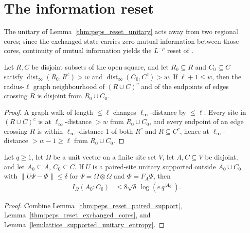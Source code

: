 \section{The information reset}

The unitary of Lemma~\ref{thm:peps_reset_unitary} acts away from two regional cores; since the exchanged state carries zero mutual information between those cores, continuity of mutual information yields the $L^{-p}$ reset of \cite[Lemma~3.3]{OpenAI2026PolynomialPEPS}.

\begin{lemma}
    \label{thm:peps_reset_support_cores}
    \leanok
    Let $R,C$ be disjoint subsets of the open square, and let $R_0\subseteq R$ and $C_0\subseteq C$ satisfy $\operatorname{dist}_\infty(R_0,R^c)>w$ and $\operatorname{dist}_\infty(C_0,C^c)>w$. If $\ell+1\le w$, then the radius-$\ell$ graph neighbourhood of $(R\cup C)^c$ and of the endpoints of edges crossing $R$ is disjoint from $R_0\cup C_0$.
\end{lemma}
\begin{proof}
    \leanok
    A graph walk of length $\le\ell$ changes $\ell_\infty$-distance by $\le\ell$. Every site in $(R\cup C)^c$ is at $\ell_\infty$-distance $>w$ from $R_0\cup C_0$, and every endpoint of an edge crossing $R$ is within $\ell_\infty$-distance $1$ of both $R^c$ and $R\subseteq C^c$, hence at $\ell_\infty$-distance $>w-1\ge\ell$ from $R_0\cup C_0$.
\end{proof}



\begin{lemma}
    \label{thm:peps_reset_cores_entropy_sites}
    \leanok
    Let $q\ge1$, let $\Omega$ be a unit vector on a finite site set $V$, let $A,C\subseteq V$ be disjoint, and let $A_0\subseteq A$, $C_0\subseteq C$. If $U$ is a paired-site unitary supported outside $A_0\cup C_0$ with $\|U\Psi-\Phi\|\le\delta$ for $\Psi=\Omega\otimes\Omega$ and $\Phi=F_A\Psi$, then
    \begin{align}
        I_\Omega(A_0:C_0) & \le8\sqrt\delta\,\log(e\,q^{|A_0|}).
        \label{eq:peps_reset_cores_entropy_sites}
    \end{align}
\end{lemma}
\begin{proof}
    \leanok
    Combine Lemma~\ref{thm:peps_reset_paired_support}, Lemma~\ref{thm:peps_reset_exchanged_cores}, and Lemma~\ref{lem:lattice_supported_unitary_entropy}.
\end{proof}

